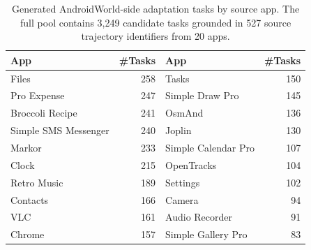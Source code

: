\begin{table}[h]
\centering
\paperTable
\caption{Generated AndroidWorld-side adaptation tasks by source app. The full pool contains 3,249 candidate tasks grounded in 527 source trajectory identifiers from 20 apps.}
\label{tab:generated_task_corpus}
\begin{tabular}{@{}l r@{\qquad\qquad}l r@{}}
\toprule
\textbf{App} & \textbf{\#Tasks} & \textbf{App} & \textbf{\#Tasks} \\
\midrule
Files & 258 & Tasks & 150 \\
Pro Expense & 247 & Simple Draw Pro & 145 \\
Broccoli Recipe & 241 & OsmAnd & 136 \\
Simple SMS Messenger & 240 & Joplin & 130 \\
Markor & 233 & Simple Calendar Pro & 107 \\
Clock & 215 & OpenTracks & 104 \\
Retro Music & 189 & Settings & 102 \\
Contacts & 166 & Camera & 94 \\
VLC & 161 & Audio Recorder & 91 \\
Chrome & 157 & Simple Gallery Pro & 83 \\
\bottomrule
\end{tabular}
\end{table}
